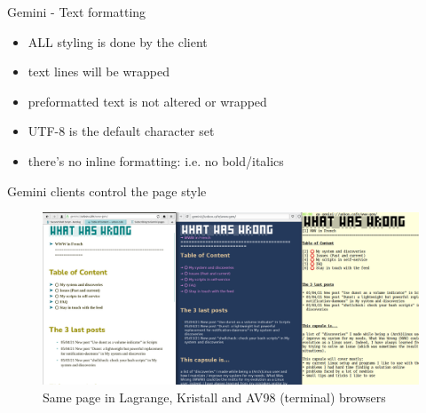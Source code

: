 \documentclass[presentation, 11pt,  aspectratio=169]{beamer}
\begin{document}
\begin{frame}[label={sec:org631e463}]{Gemini - Text formatting}
\begin{itemize}
\item \alert{ALL} styling is done by the client\\
\item text lines will be wrapped\\
\item preformatted text is not altered or wrapped\\
\item UTF-8 is the default character set\\
\item there's no inline formatting: i.e. no bold/italics\\
\end{itemize}
\end{frame}

\begin{frame}[label={sec:org43f5d72}]{Gemini clients control the page style}
\begin{figure}[htbp]
\centering
\includegraphics[width=1\textwidth]{images/threebrowsers.png}
\caption{Same page in Lagrange, Kristall and AV98 (terminal) browsers}
\end{figure}
\end{frame}
\end{document}
